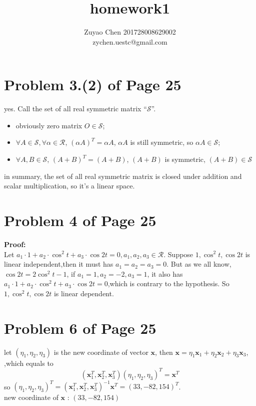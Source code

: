 \documentclass[12pt,a4paper]{article}
\title{homework1}
\author{Zuyao Chen 201728008629002 \\ zychen.uestc@gmail.com}
\date{}
\begin{document}
\maketitle
\section{Problem 3.(2) of Page 25}
yes. 
Call the set of all real symmetric matrix ``$\mathcal{S}$''.
\begin{itemize}
	\item obviously zero matrix $O \in \mathcal{S}$;
	\item $\forall A \in \mathcal{S},\forall \alpha \in \mathcal{R}$, 
			$(\alpha A)^{T} = \alpha A$, $\alpha A$ is still symmetric,
			so $\alpha A \in \mathcal{S}$;
	\item $\forall A , B \in \mathcal{S}$, $(A+B)^{T} = (A+B)$,
			$(A+B)$ is symmetric, $(A+B) \in \mathcal{S}$		
\end{itemize}
in summary,	the set of all real symmetric matrix is closed under addition and scalar multiplication, so it's a linear space.
\section{Problem 4 of Page 25}
\textbf{Proof:} \\
\indent Let
$a_1 \cdot 1 + a_2 \cdot \cos^{2}t + a_3 \cdot \cos 2t = 0,a_1,a_2,a_3 \in \mathcal{R}$.
Suppose $1, \cos^{2} t, \cos 2t$ is linear independent,then 
it must has $ a_1 = a_2 = a_3 = 0$.
But as we all know,$\cos 2t = 2\cos^{2} t - 1$,
if $a_1 = 1, a_2 = -2 , a_3 = 1$, it also has $a_1 \cdot 1 + a_2 \cdot \cos^{2}t + a_3 \cdot \cos 2t = 0$,which is contrary to the hypothesis.
So $1, \cos^{2} t, \cos 2t$ is linear dependent.

\section{Problem 6 of Page 25}
let $(\eta_1,\eta_2,\eta_3)$ is the new coordinate of vector $\mathbf{x}$,
then 
$\mathbf{x}= \eta_1\mathbf{x}_1 + \eta_2\mathbf{x}_2+ \eta_3\mathbf{x}_3 $,
,which equals to 
\[
(\mathbf{x}_1^{T},\mathbf{x}_2^{T},\mathbf{x}_3^{T}) (\eta_1,\eta_2,\eta_3)^{T} = \mathbf{x}^{T}
\]
so $(\eta_1,\eta_2,\eta_3)^{T} 
= (\mathbf{x}_1^{T},\mathbf{x}_2^{T},\mathbf{x}_3^{T})^{-1}\mathbf{x}^{T} 
= (33,-82,154)^{T}$.\\
new coordinate of $\mathbf{x}$ : $(33,-82,154)$
\end{document}
